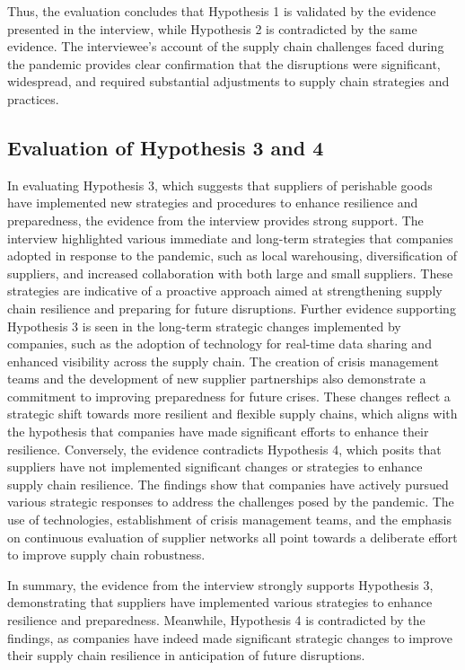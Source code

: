 Thus, the evaluation concludes that Hypothesis 1 is validated by the evidence presented in the interview, while Hypothesis 2 is contradicted by the same evidence. The interviewee's account of the supply chain challenges faced during the pandemic provides clear confirmation that the disruptions were significant, widespread, and required substantial adjustments to supply chain strategies and practices.

\subsection{Evaluation of Hypothesis 3 and 4}

In evaluating Hypothesis 3, which suggests that suppliers of perishable goods have implemented new strategies and procedures to enhance resilience and preparedness, the evidence from the interview provides strong support. The interview highlighted various immediate and long-term strategies that companies adopted in response to the pandemic, such as local warehousing, diversification of suppliers, and increased collaboration with both large and small suppliers. These strategies are indicative of a proactive approach aimed at strengthening supply chain resilience and preparing for future disruptions. Further evidence supporting Hypothesis 3 is seen in the long-term strategic changes implemented by companies, such as the adoption of technology for real-time data sharing and enhanced visibility across the supply chain. The creation of crisis management teams and the development of new supplier partnerships also demonstrate a commitment to improving preparedness for future crises. These changes reflect a strategic shift towards more resilient and flexible supply chains, which aligns with the hypothesis that companies have made significant efforts to enhance their resilience. Conversely, the evidence contradicts Hypothesis 4, which posits that suppliers have not implemented significant changes or strategies to enhance supply chain resilience. The findings show that companies have actively pursued various strategic responses to address the challenges posed by the pandemic. The use of technologies, establishment of crisis management teams, and the emphasis on continuous evaluation of supplier networks all point towards a deliberate effort to improve supply chain robustness.

In summary, the evidence from the interview strongly supports Hypothesis 3, demonstrating that suppliers have implemented various strategies to enhance resilience and preparedness. Meanwhile, Hypothesis 4 is contradicted by the findings, as companies have indeed made significant strategic changes to improve their supply chain resilience in anticipation of future disruptions.

